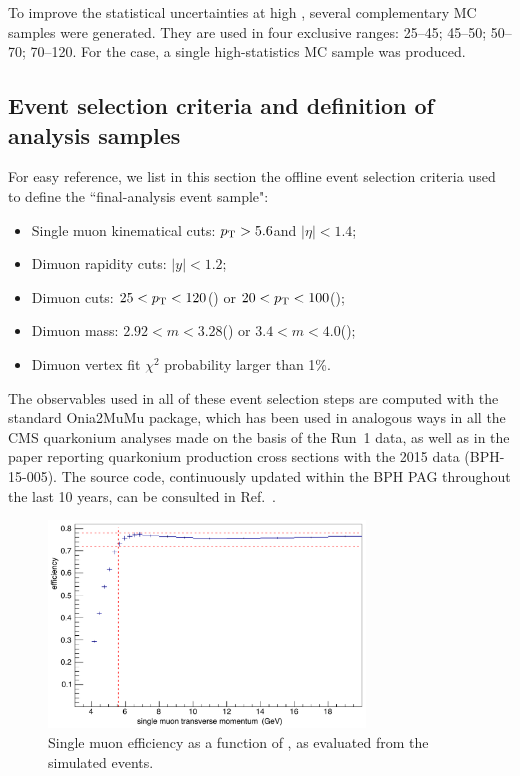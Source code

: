 To improve the statistical uncertainties at high \pt, several complementary 
\jpsi MC samples were generated. They are used in four exclusive ranges:
25--45; 45--50; 50--70; 70--120\GeV. 
For the \psip case, a single high-statistics MC sample was produced.


\subsection{Event selection criteria and definition of analysis samples}
\label{sec:eventsel}

For easy reference, we list in this section the offline event selection criteria used to define the
``final-analysis event sample":
\begin{itemize}
\item Single muon kinematical cuts: $p_\text{T} > 5.6$\GeV and $|\eta| < 1.4$;
\item Dimuon rapidity cuts: $|y| < 1.2$;
\item Dimuon \pt cuts: $25 < p_\text{T} < 120$\GeV (\jpsi) or $20 < p_\text{T} < 100$\GeV (\psip);
\item Dimuon mass: $2.92 < m < 3.28$\GeV (\jpsi) or $3.4 < m < 4.0$\GeV (\psip);
\item Dimuon vertex fit $\chi^2$ probability larger than 1\%.
\end{itemize}

The observables used in all of these event selection steps are computed 
with the standard Onia2MuMu package, 
which has been used in analogous ways in all the CMS quarkonium analyses 
made on the basis of the Run~1 data, 
as well as in the paper reporting quarkonium production cross sections with the 2015 data (BPH-15-005).
The source code, continuously updated within the BPH PAG throughout the last 10 years,
can be consulted in Ref.~\cite{bib:onia2mumu}.

\begin{figure}[h]
\centering
\includegraphics[width=0.75\textwidth]{Figures/chapter2/efficiency_vs_ptmuon.pdf}
\caption{Single muon efficiency as a function of \pt, as evaluated from the simulated events.}
\label{fig:muon_eff}
\end{figure}

